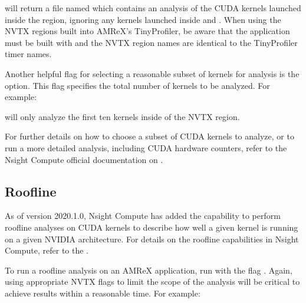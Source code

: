 \documentclass[letterpaper,10pt,english]{sphinxmanual}
\begin{document}
\sphinxAtStartPar
will return a file named  which contains an analysis of the CUDA kernels launched inside
the  region, ignoring any kernels launched inside  and .
When using the NVTX regions built into AMReX’s TinyProfiler, be aware that the application must be built
with  and the NVTX region names are identical to the TinyProfiler timer names.

\sphinxAtStartPar
Another helpful flag for selecting a reasonable subset of kernels for analysis is the  option. This
flag specifies the total number of kernels to be analyzed. For example:

\begin{sphinxVerbatim}[commandchars=\\\{\}]
\end{sphinxVerbatim}

\sphinxAtStartPar
will only analyze the first ten kernels inside of the  NVTX region.

\sphinxAtStartPar
For further details on how to choose a subset of CUDA kernels to analyze, or to run a more detailed
analysis, including CUDA hardware counters, refer to the Nsight Compute official documentation on
.


\subsection{Roofline}
\label{\detokenize{External_Profiling_Tools:roofline}}
\sphinxAtStartPar
As of version 2020.1.0, Nsight Compute has added the capability to perform roofline analyses on CUDA
kernels to describe how well a given kernel is running on a given NVIDIA architecture.  For details
on the roofline capabilities in Nsight Compute, refer to the .

\sphinxAtStartPar
To run a roofline analysis on an AMReX application, run  with the flag
. Again, using appropriate NVTX flags to limit the scope of the
analysis will be critical to achieve results within a reasonable time. For example:
\end{document}
